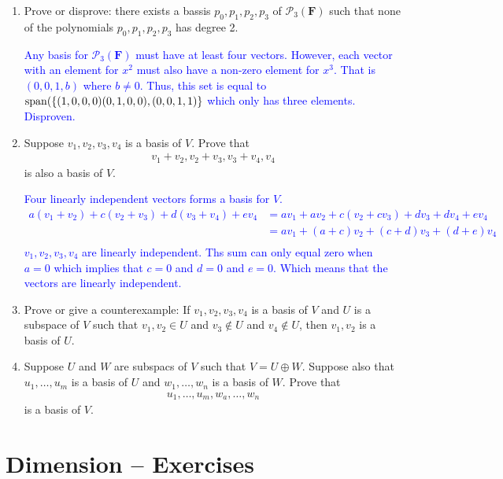 \documentclass[10pt,a4paper]{report}
\newcommand{\BLUE}[1]{\textcolor{blue}{#1}}
\newcommand{\F}{\textbf{F}}
\begin{document}
\begin{enumerate}
	\item Prove or disprove: there exists a bassis $p_0, p_1,p_2,p_3$ of $\mathcal{P}_3(\F)$ such that none of the polynomials $p_0,p_1,p_2,p_3$ has degree 2.

	\BLUE{Any basis for $\mathcal{P}_3(\F)$ must have at least four vectors.  However, each vector with an element for $x^2$ must also have a non-zero element for $x^3$.  That is $(0,0,1,b)$ where $b \ne 0$.  Thus, this set is equal to $\operatorname{span}(\{(1,0,0,0)(0,1,0,0),(0,0,1,1)\}$ which only has three elements.  Disproven.
	}
	
	\item Suppose $v_1,v_2,v_3,v_4$ is a basis of $V$.  Prove that 
	\begin{align*}
		v_1+v_2,v_2+v_3,v_3+v_4, v_4
	\end{align*}is also a basis of $V$.
	
	\BLUE{Four linearly independent vectors forms a basis for $V$.
	\begin{align*}
		a(v_1+v_2)+c(v_2+v_3)+d(v_3+v_4)+ ev_4 &= av_1+av_2+c(v_2+cv_3)+dv_3+dv_4+ev_4 \\
		&= av_1+(a+c)v_2+(c+d)v_3+(d+e)v_4 \\
	\end{align*} $v_1,v_2,v_3,v_4$ are linearly independent.  Ths sum can only equal zero when $a=0$ which implies that $c=0$ and $d=0$ and $e=0$. Which means that the vectors are linearly independent.
	}
	
	\item Prove or give a counterexample:  If $v_1,v_2,v_3,v_4$ is a basis of $V$ and $U$ is a subspace of $V$ such that $v_1,v_2 \in U$ and $v_3\not\in U$ and $v_4 \not\in U$, then $v_1,v_2$ is a basis of $U$.
	
	\item Suppose $U$ and $W$ are subspacs of $V$ such that $V=U \oplus W$.  Suppose also that $u_1,\dots,u_m$ is a basis of $U$ and $w_1,\dots,w_n$ is a basis of $W$. Prove that 
	\begin{align*}
		u_1,\dots,u_m,w_a,\dots,w_n
	\end{align*}is a basis of $V$.
\end{enumerate}


\section{Dimension -- Exercises}
\newcommand{\PP}[1]{\mathcal{P}_#1(\F)}
\end{document}
